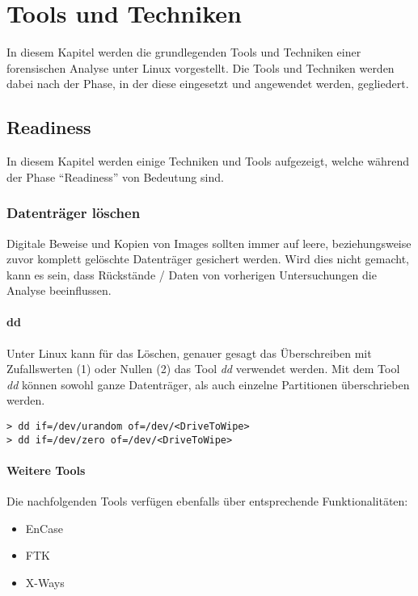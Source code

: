 \chapter{Tools und Techniken} \label{chap:ToolsTechniques}
In diesem Kapitel werden die grundlegenden Tools und Techniken einer forensischen Analyse unter Linux vorgestellt. Die Tools und Techniken werden dabei nach der Phase, in der diese eingesetzt und angewendet werden, gegliedert.




\section{Readiness}
In diesem Kapitel werden einige Techniken und Tools aufgezeigt, welche während der Phase "`Readiness"' von Bedeutung sind.


\subsection{Datenträger löschen}
Digitale Beweise und Kopien von Images sollten immer auf leere, beziehungsweise zuvor komplett gelöschte Datenträger gesichert werden. Wird dies nicht gemacht, kann es sein, dass Rückstände / Daten von vorherigen Untersuchungen die Analyse beeinflussen.

\subsubsection{dd}
Unter Linux kann für das Löschen, genauer gesagt das Überschreiben mit Zufallswerten (1) oder Nullen (2) das Tool \textit{dd} verwendet werden.
Mit dem Tool \textit{dd} können sowohl ganze Datenträger, als auch einzelne Partitionen überschrieben werden.

\begin{lstlisting}
> dd if=/dev/urandom of=/dev/<DriveToWipe>
> dd if=/dev/zero of=/dev/<DriveToWipe>
\end{lstlisting}

\subsubsection{Weitere Tools}
Die nachfolgenden Tools verfügen ebenfalls über entsprechende Funktionalitäten:
\begin{itemize}
\item EnCase
\item FTK
\item X-Ways
\end{itemize}




